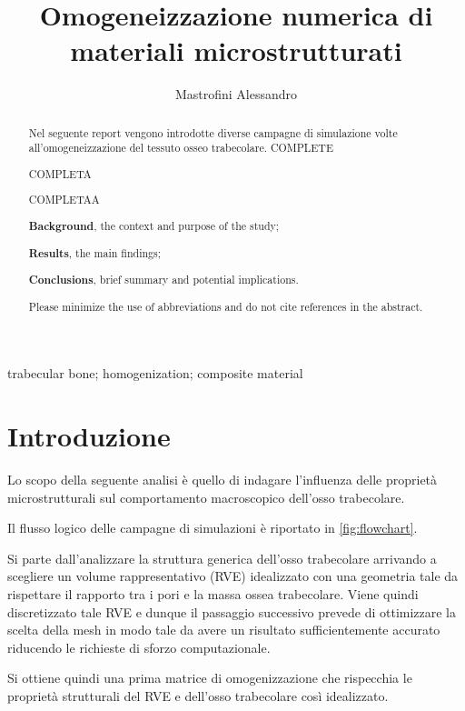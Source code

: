 \documentclass[a4paper,num-refs]{oup-contemporary}
\title{Omogeneizzazione numerica di materiali microstrutturati}
\author{Mastrofini Alessandro}
\begin{document}
\begin{frontmatter}
\maketitle
\begin{abstract}

Nel seguente report vengono introdotte diverse campagne di simulazione volte all'omogeneizzazione del tessuto osseo trabecolare. 
COMPLETE

COMPLETA

COMPLETAA


 \textbf{Background}, the context and purpose of the study;
 
  \textbf{Results}, the main findings;
  
   \textbf{Conclusions}, brief summary and potential implications. 
   
   Please minimize the use of abbreviations and do not cite references in the abstract.
\end{abstract}

\begin{keywords}
trabecular bone; homogenization; composite material
\end{keywords}
\end{frontmatter}



\section{Introduzione}

Lo scopo della seguente analisi è quello di indagare l'influenza delle proprietà microstrutturali sul comportamento macroscopico dell'osso trabecolare.

Il flusso logico delle campagne di simulazioni è riportato in \cref{fig:flowchart}. 

Si parte dall'analizzare la struttura generica dell'osso trabecolare arrivando a scegliere un volume rappresentativo (RVE) idealizzato con una geometria tale da rispettare il rapporto tra i pori e la massa ossea trabecolare. Viene quindi discretizzato tale RVE e dunque il passaggio successivo prevede di ottimizzare la scelta della mesh in modo tale da avere un risultato sufficientemente accurato riducendo le richieste di sforzo computazionale. 

Si ottiene quindi una prima matrice di omogenizzazione che rispecchia le proprietà strutturali del RVE e dell'osso trabecolare così idealizzato. 
\end{document}
